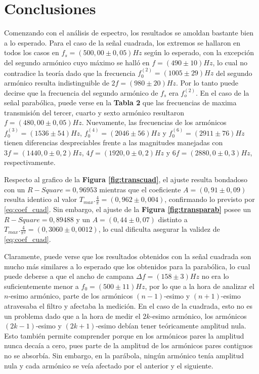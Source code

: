 \documentclass[11pt,a4paper]{article}
\begin{document}
\section{Conclusiones}
\label{sec:conclusiones}

Comenzando con el análisis de espectro, los resultados se amoldan bastante bien a lo esperado. Para el caso de la señal cuadrada, los extremos se hallaron en todos los casos en $f_s = (500,00 \pm 0,05)Hz$ según lo esperado, con la excepción del segundo armónico cuyo máximo se halló en $f = (490 \pm 10)Hz$, lo cual no contradice la teoría dado que la frecuencia $f_0^{(2)} = (1005 \pm 29)Hz$ del segundo armónico resulta indistinguible de $2f = (980 \pm 20)Hz$. Por lo tanto puede decirse que la frecuencia del segundo armónico de $f_s$ era $f_o^{(2)}$. En el caso de la señal parabólica, puede verse en la \textbf{Tabla 2} que las frecuencias de maxima transmisión del tercer, cuarto y sexto armónico resultaron $f = (480,00 \pm 0,05)Hz$. Nuevamente, las frecuencias de los armónicos $f_0^{(3)} = (1536 \pm 54)Hz$, $f_0^{(4)} = (2046 \pm 56)Hz$ y $f_0^{(6)} = (2911 \pm 76)Hz$ tienen diferencias despreciables frente a las magnitudes manejadas con $3f = (1440,0 \pm 0,2)Hz$, $4f = (1920,0 \pm 0,2)Hz$ y $6f = (2880,0 \pm 0,3)Hz$, respectivamente. 

Respecto al grafico de la \textbf{Figura \ref{fig:transcuad}}, el ajuste resulta bondadoso con un $R-Square = 0,96953$ mientras que el coeficiente $A = (0,91 \pm 0,09)$ resulta identico al valor $T_{max}.\frac{4}{\pi} = (0,962 \pm 0,004)$, confirmando lo previsto por \eqref{eq:coef_cuad}. Sin embargo, el ajuste de la \textbf{Figura \ref{fig:transparab}} posee un $R-Square = 0,89488$ y un $A = (0,44 \pm 0,07)$ distinto a $T_{max}.\frac{4}{\pi^2} = (0,3060 \pm 0,0012)$, lo cual dificulta asegurar la validez de \eqref{eq:coef_cuad}. 

Claramente, puede verse que los resultados obtenidos con la señal cuadrada son mucho más similares a lo esperado que los obtenidos para la parabólica, lo cual puede deberse a que el ancho de campana $\Delta f = (158 \pm 3)Hz$ no era lo suficientemente menor a $f_0 = (500 \pm 11)Hz$, por lo que a la hora de analizar el $n$-esimo armónico, parte de los armónicos $(n-1)$-esimo y $(n+1)$-esimo atravesaba el filtro y afectaba la medición. En el caso de la cuadrada, esto no es un problema dado que a la hora de medir el $2k$-esimo armónico, los armónicos $(2k-1)$-esimo y $(2k+1)$-esimo debían tener teóricamente amplitud nula. Esto también permite comprender porque en los armónicos pares la amplitud nunca decaía a cero, pues parte de la amplitud de los armónicos pares contiguos no se absorbía. Sin embargo, en la parábola, ningún armónico tenía amplitud nula y cada armónico se veía afectado por el anterior y el siguiente. 
\end{document}
